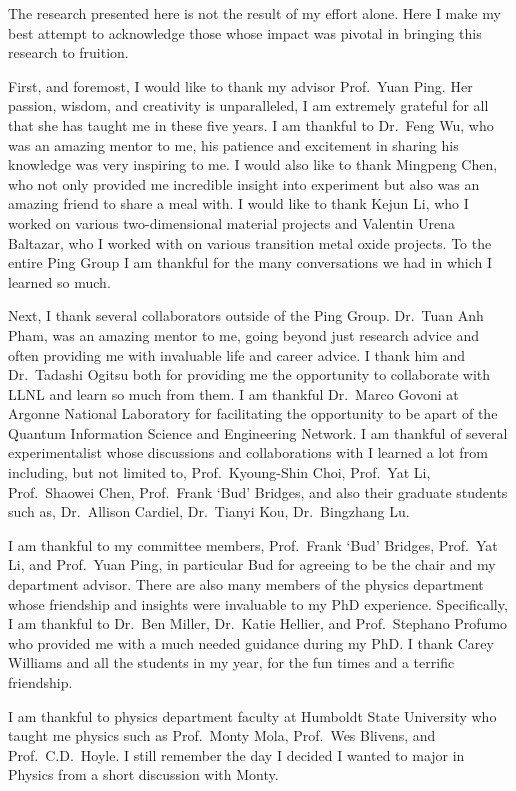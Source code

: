 \documentclass[12pt]{../include/ucthesis}
\begin{document}
\begin{frontmatter}
\begin{acknowledgements}
    The research presented here is not the result of my effort alone. Here I make my best attempt to acknowledge those whose impact was pivotal in bringing this research to fruition.

    First, and foremost, I would like to thank my advisor Prof.\ Yuan Ping. Her passion, wisdom, and creativity is unparalleled, I am extremely grateful for all that she has taught me in these five years. I am thankful to Dr.\ Feng Wu, who was an amazing mentor to me, his patience and excitement in sharing his knowledge was very inspiring to me. I would also like to thank Mingpeng Chen, who not only provided me incredible insight into experiment but also was an amazing friend to share a meal with. I would like to thank Kejun Li, who I worked on various two-dimensional material projects and Valentin Urena Baltazar, who I worked with on various transition metal oxide projects. To the entire Ping Group I am thankful for the many conversations we had in which I learned so much.

    Next, I thank several collaborators outside of the Ping Group. Dr.\ Tuan Anh Pham, was an amazing mentor to me, going beyond just research advice and often providing me with invaluable life and career advice. I thank him and Dr.\ Tadashi Ogitsu both for providing me the opportunity to collaborate with LLNL and learn so much from them. I am thankful Dr.\ Marco Govoni at Argonne National Laboratory for facilitating the opportunity to be apart of the Quantum Information Science and Engineering Network. I am thankful of several experimentalist whose discussions and collaborations with I learned a lot from including, but not limited to, Prof.\ Kyoung-Shin Choi, Prof.\ Yat Li, Prof.\ Shaowei Chen, Prof.\ Frank `Bud' Bridges, and also their graduate students such as, Dr.\ Allison Cardiel, Dr.\ Tianyi Kou, Dr.\ Bingzhang Lu.

    I am thankful to my committee members, Prof.\ Frank `Bud' Bridges, Prof.\ Yat Li, and Prof.\ Yuan Ping, in particular Bud for agreeing to be the chair and my department advisor. There are also many members of the physics department whose friendship and insights were invaluable to my PhD experience. Specifically, I am thankful to Dr.\ Ben Miller, Dr.\ Katie Hellier, and Prof.\ Stephano Profumo who provided me with a much needed guidance during my PhD. I thank Carey Williams and all the students in my year, for the fun times and a terrific friendship.

    I am thankful to physics department faculty at Humboldt State University who taught me physics such as Prof.\ Monty Mola, Prof.\ Wes Blivens, and Prof.\ C.D.\ Hoyle. I still remember the day I decided I wanted to major in Physics from a short discussion with Monty.


\end{acknowledgements}
\end{frontmatter}
\end{document}
